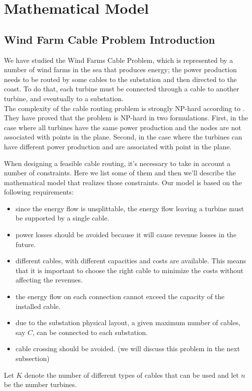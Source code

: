 
\chapter{Mathematical Model}
\label{chp:2-Model}

\section{Wind Farm Cable Problem Introduction}
We have studied the Wind Farms Cable Problem, which is represented by a number of wind farms in the sea that produces energy; the power production needs to be routed by some cables to the substation and then directed to the coast.
To do that, each turbine must be connected through a cable to another turbine, and eventually to a substation.\\

The complexity of the cable routing problem is strongly NP-hard according to \cite{wfcp}. They have proved that the problem is NP-hard in two formulations. First, in the case where all turbines have the same power production and the nodes are not associated with points in the plane. Second, in the case where the turbines can have different power production and are associated with point in the plane. 

When designing a feasible cable routing, it's necessary to take in account a number of constraints. Here we list some of them and then we'll describe the mathematical model that realizes those constraints. Our model is based on the following requirements:

\begin{itemize}
\item since the energy flow is unsplittable, the energy flow leaving a turbine must be supported by a single cable.
\item power losses should be avoided because it will cause revenue losses in the future.
\item different cables, with different capacities and costs are available. This means that it is important to choose the right cable to minimize the costs without affecting the revenues. 
\item the energy flow on each connection cannot exceed the capacity of the installed cable.
\item due to the substation physical layout, a given maximum number of cables, say $C$, can be connected to each substation.
\item cable crossing should be avoided. (we will discuss this problem in the next subsection)
\end{itemize}
Let $K$ denote the number of different types of cables that can be used and let $n$ be the number turbines. 

